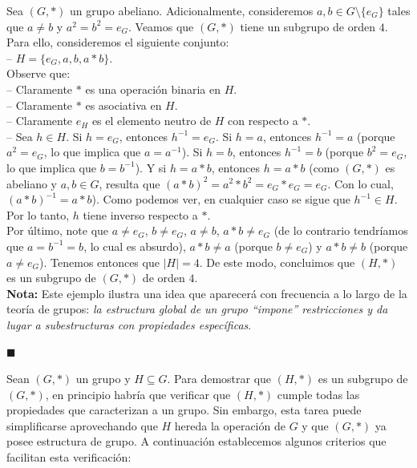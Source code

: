 \documentclass[10 pt]{article}
\begin{document}
\Large{Sea $(G,*)$ un grupo abeliano. Adicionalmente, consideremos $a,b \in G \setminus \{e_G\}$ tales que $a \neq b$ y $a^2=b^2=e_G$. Veamos que $(G,*)$ tiene un subgrupo de orden $4$. Para ello, consideremos el siguiente conjunto: \\

-- $H=\{e_G,a,b,a*b\}$. \\

Observe que: \\

-- Claramente $*$ es una operación binaria en $H$. \\

-- Claramente $*$ es asociativa en $H$. \\

-- Claramente $e_H$ es el elemento neutro de $H$ con respecto a $*$.  \\

-- Sea $h \in H$. Si $h=e_G$, entonces $h^{-1}=e_G$. Si $h=a$, entonces $h^{-1}=a$ (porque $a^2=e_G$, lo que implica que $a=a^{-1}$). Si $h=b$, entonces $h^{-1}=b$ (porque $b^2=e_G$, lo que implica que $b=b^{-1}$). Y si $h=a*b$, entonces $h=a*b$ (como $(G,*)$ es abeliano y $a,b \in G$, resulta que $(a*b)^2=a^2*b^2=e_G*e_G=e_G$. Con lo cual, $(a*b)^{-1}=a*b$). Como podemos ver, en cualquier caso se sigue que $h^{-1} \in H$. Por lo tanto, $h$ tiene inverso respecto a $*$. \\

Por último, note que $a \neq e_G$, $b \neq e_G$, $a \neq b$, $a*b \neq e_G$ (de lo contrario tendríamos que $a=b^{-1}=b$, lo cual es absurdo), $a*b \neq a$ (porque $b \neq e_G$) y $a*b \neq b$ (porque $a \neq e_G$). Tenemos entonces que $|H|=4$. De este modo, concluimos que $(H,*)$ es un subgrupo de $(G,*)$ de orden $4$.} \\ 

\Large{\textbf{Nota:} Este ejemplo ilustra una idea que aparecerá con frecuencia a lo largo de la teoría de grupos: \textit{la estructura global de un grupo ``impone'' restricciones y da lugar a subestructuras con propiedades específicas}.} \\

\begin{flushright}
    $\blacksquare$
\end{flushright}

\Large{Sean $(G,*)$ un grupo y $H\subseteq G$. Para demostrar que $(H,*)$ es un subgrupo de $(G,*)$, en principio habría que verificar que $(H,*)$ cumple todas las propiedades que caracterizan a un grupo. Sin embargo, esta tarea puede simplificarse aprovechando que $H$ hereda la operación de $G$ y que $(G,*)$ ya posee estructura de grupo. A continuación establecemos algunos criterios que facilitan esta verificación:} \\
\end{document}
